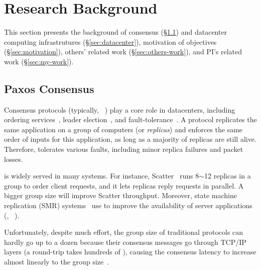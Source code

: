 \vspace{-.15in}\section{Research Background} 
\label{sec:background}\vspace{-.075in}

This section presents the background of consensus (\S\ref{sec:consensus}) and 
datacenter computing infrastrutures (\S\ref{sec:datacenter}), motivation of 
objectives (\S\ref{sec:motivation}), others' related work 
(\S\ref{sec:others-work}), and PI's related work (\S\ref{sec:my-work}).

\vspace{-.15in}\subsection{Paxos Consensus} 
\label{sec:consensus}\vspace{-.075in}

Consensus protocols (typically, 
\paxos~\cite{paxos:practical,paxos,paxos:simple,paxos:complex}) play a core
role in datacenters, including 
ordering services~\cite{ellis:thesis,manos:hotdep10,scatter:sosp11},
leader election~\cite{zookeeper, chubby:osdi}, and
fault-tolerance~\cite{eve:osdi12,rex:eurosys14,crane:sosp15}. A \paxos protocol
replicates the same application on a group of computers (or \emph{replicas}) 
and enforces the same order of inputs for this application, as long as 
a majority of replicas are still alive. Therefore, \paxos tolerates 
various faults, including minor replica failures and packet losses.

\paxos is widely served in many systems. For instance, 
Scatter~\cite{scatter:sosp11} runs 8$\sim$12 replicas in a
\paxos group to order client requests, and it lets replicas reply requests
in parallel. A bigger group size will improve Scatter throughput. 
Moreover, state machine replication (SMR) 
systems~\cite{eve:osdi12,rex:eurosys14,crane:sosp15} use \paxos to 
improve the availability of server applications (\eg, \mysql~\cite{mysql}).

Unfortunately, despite much effort, the group size of traditional \paxos 
protocols can hardly go up to a dozen because their consensus messages 
go through TCP/IP layers (a round-trip takes hundreds of \us), causing the 
consensus latency to increase almost linearly to the group 
size~\cite{scatter:sosp11,zookeeper,manos:hotdep10,crane:sosp15}.

